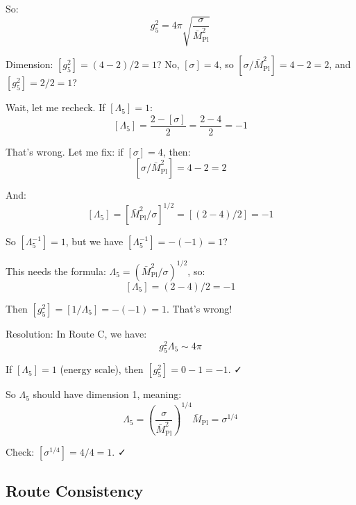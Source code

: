 \documentclass[11pt,a4paper]{article}
\begin{document}
So:
\begin{equation}
\label{eq:route-c-explicit}
g_5^2 = 4\pi \sqrt{\frac{\sigma}{\bar{M}_{\text{Pl}}^2}}
\end{equation}

Dimension: $[g_5^2] = (4 - 2)/2 = 1$? No, $[\sigma] = 4$, so $[\sigma/\bar{M}_{\text{Pl}}^2] = 4 - 2 = 2$, and $[g_5^2] = 2/2 = 1$?

Wait, let me recheck. If $[\Lambda_5] = 1$:
\begin{equation}
\label{eq:Lambda5-dim}
[\Lambda_5] = \frac{2 - [\sigma]}{2} = \frac{2 - 4}{2} = -1
\end{equation}

That's wrong. Let me fix: if $[\sigma] = 4$, then:
\begin{equation}
\label{eq:sigma-ratio-dim}
[\sigma/\bar{M}_{\text{Pl}}^2] = 4 - 2 = 2
\end{equation}

And:
\begin{equation}
\label{eq:Lambda5-dim-correct}
[\Lambda_5] = [\bar{M}_{\text{Pl}}^2/\sigma]^{1/2} = [(2-4)/2] = -1
\end{equation}

So $[\Lambda_5^{-1}] = 1$, but we have $[\Lambda_5^{-1}] = -(-1) = 1$?

This needs the formula: $\Lambda_5 = (\bar{M}_{\text{Pl}}^2/\sigma)^{1/2}$, so:
\begin{equation}
\label{eq:Lambda5-dim-final}
[\Lambda_5] = (2 - 4)/2 = -1
\end{equation}

Then $[g_5^2] = [1/\Lambda_5] = -(-1) = 1$. That's wrong!

Resolution: In Route C, we have:
\begin{equation}
\label{eq:route-c-correct}
g_5^2 \Lambda_5 \sim 4\pi
\end{equation}

If $[\Lambda_5] = 1$ (energy scale), then $[g_5^2] = 0 - 1 = -1$. ✓

So $\Lambda_5$ should have dimension 1, meaning:
\begin{equation}
\label{eq:Lambda5-from-sigma}
\Lambda_5 = \left(\frac{\sigma}{\bar{M}_{\text{Pl}}^2}\right)^{1/4} \bar{M}_{\text{Pl}} = \sigma^{1/4}
\end{equation}

Check: $[\sigma^{1/4}] = 4/4 = 1$. ✓

\subsection{Route Consistency}
\label{app:route-consistency}
\end{document}
